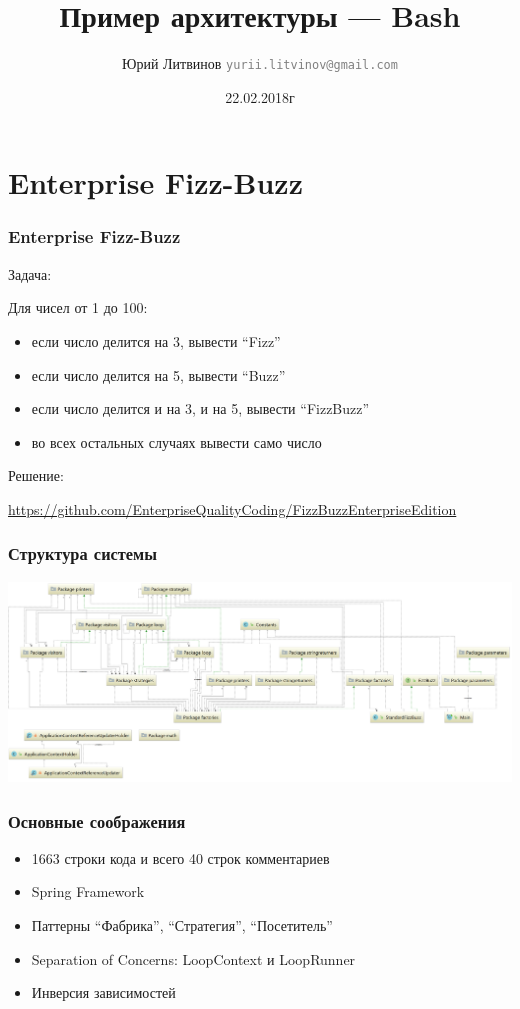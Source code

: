 \documentclass[xetex,mathserif,serif]{beamer}
\title{Пример архитектуры --- Bash}
\author[Юрий Литвинов]{Юрий Литвинов \newline \textcolor{gray}{\small\texttt{yurii.litvinov@gmail.com}}}
\date{22.02.2018г}
\begin{document}
	
	\frame{\titlepage}

	\section{Enterprise Fizz-Buzz}

	\begin{frame}
		\frametitle{Enterprise Fizz-Buzz}
		Задача:

		Для чисел от 1 до 100:
		\begin{itemize}
			\item если число делится на 3, вывести ``Fizz''
			\item если число делится на 5, вывести ``Buzz''
			\item если число делится и на 3, и на 5, вывести ``FizzBuzz''
			\item во всех остальных случаях вывести само число
		\end{itemize}

		Решение:

		\url{https://github.com/EnterpriseQualityCoding/FizzBuzzEnterpriseEdition}
	\end{frame}

	\begin{frame}
		\frametitle{Структура системы}
		\begin{center}
			\includegraphics[width=\textwidth]{fizzBuzzArchitecture.png}
		\end{center}
	\end{frame}

	\begin{frame}
		\frametitle{Основные соображения}
		\begin{itemize}
			\item 1663 строки кода и всего 40 строк комментариев
			\item Spring Framework
			\item Паттерны ``Фабрика'', ``Стратегия'', ``Посетитель''
			\item Separation of Concerns: LoopContext и LoopRunner
			\item Инверсия зависимостей
		\end{itemize}
	\end{frame}
\end{document}
